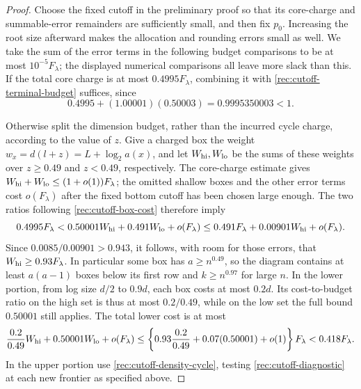 \begin{proof}
Choose the fixed cutoff in the preliminary proof so that its
core-charge and summable-error remainders are sufficiently small, and
then fix $p_0$.  Increasing the root size afterward makes the allocation
and rounding errors small as well.  We take the sum of the error terms
in the following budget comparisons to be at most $10^{-5}F_\lambda$;
the displayed numerical comparisons all leave more slack than this.
If the total core charge is at most
$0.4995F_\lambda$, combining it with
\eqref{rec:cutoff-terminal-budget} suffices, since
\begin{equation}\label{rec:cutoff-ordinary-slack}
 0.4995+(1.00001)(0.50003)=0.9995350003<1.
\end{equation}

Otherwise split the dimension budget, rather than the incurred cycle
charge, according to the value of $z$.  Give a charged box the weight
$w_x=d(l+z)=L+\log_2a(x)$, and let $W_{\rm hi},W_{\rm lo}$ be the
sums of these weights over $z\ge0.49$ and $z<0.49$, respectively.
The core-charge estimate gives
$W_{\rm hi}+W_{\rm lo}\le(1+o(1))F_\lambda$; the omitted shallow
boxes and the other error terms cost $o(F_\lambda)$ after the fixed
bottom cutoff has been chosen large enough.  The two ratios following
\eqref{rec:cutoff-box-cost} therefore imply
\[
 0.4995F_\lambda
 <0.50001W_{\rm hi}+0.491W_{\rm lo}+o(F_\lambda)
 \le0.491F_\lambda+0.00901W_{\rm hi}+o(F_\lambda).
\]
Since $0.0085/0.00901>0.943$, it follows, with room for those errors,
that $W_{\rm hi}\ge0.93F_\lambda$.  In particular some box has
$a\ge n^{0.49}$, so the diagram contains at least $a(a-1)$ boxes
below its first row and $k\ge n^{0.97}$ for large $n$.
In the lower portion, from log size $d/2$ to $0.9d$, each box costs
at most $0.2d$.  Its cost-to-budget ratio on the high set is thus at
most $0.2/0.49$, while on the low set the full bound $0.50001$ still
applies.  The total lower cost is at most
\[
 \frac{0.2}{0.49}W_{\rm hi}+0.50001W_{\rm lo}+o(F_\lambda)
 \le\left\{0.93\frac{0.2}{0.49}+0.07(0.50001)+o(1)\right\}F_\lambda
 <0.418F_\lambda.
\]
In the upper portion use \eqref{rec:cutoff-density-cycle}, testing
\eqref{rec:cutoff-diagnostic} at each new frontier as specified above.


\end{proof}

